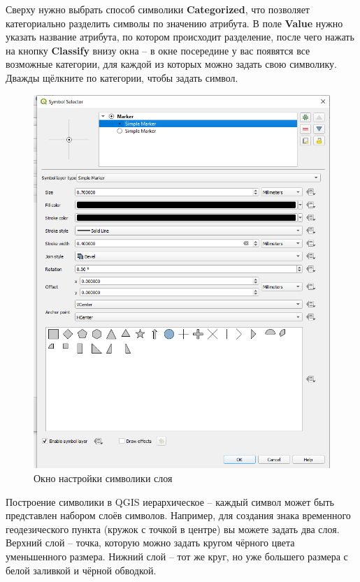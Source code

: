 \documentclass[
  12pt,
]{book}
\begin{document}
Сверху нужно выбрать способ символики \textbf{Categorized}, что позволяет категориально разделить символы по значению атрибута. В поле \textbf{Value} нужно указать название атрибута, по котором происходит разделение, после чего нажать на кнопку \textbf{Classify} внизу окна -- в окне посередине у вас появятся все возможные категории, для каждой из которых можно задать свою символику. Дважды щёлкните по категории, чтобы задать символ.

\begin{figure}
\centering
\includegraphics{images/Practice/Symbol_selector.png}
\caption{Окно настройки символики слоя}
\end{figure}

Построение символики в QGIS иерархическое -- каждый символ может быть представлен набором слоёв символов. Например, для создания знака временного геодезического пункта (кружок с точкой в центре) вы можете задать два слоя. Верхний слой -- точка, которую можно задать кругом чёрного цвета уменьшенного размера. Нижний слой -- тот же круг, но уже большего размера с белой заливкой и чёрной обводкой.
\end{document}

